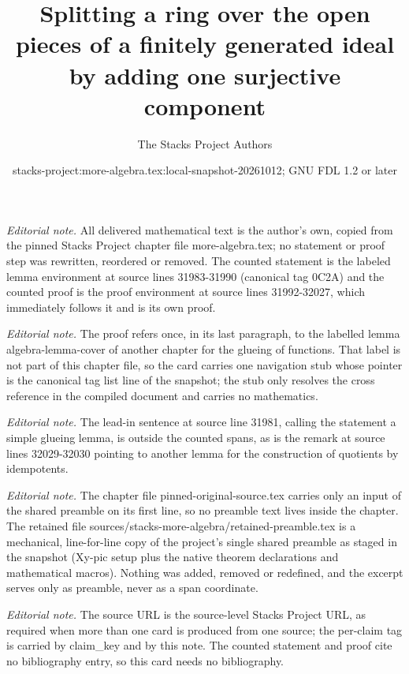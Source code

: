\documentclass[10pt,a4paper]{amsart}
\title{Splitting a ring over the open pieces of a finitely generated ideal by adding one surjective component}
\author{The Stacks Project Authors}
\date{stacks-project:more-algebra.tex:local-snapshot-20261012; GNU FDL 1.2 or later}
\theoremstyle{plain}
\theoremstyle{definition}
\theoremstyle{remark}
\numberwithin{equation}{subsection}
\begin{document}
\maketitle
\setcounter{subsection}{1}
\noindent\textit{Editorial note.} All delivered mathematical text is the author's own, copied from the pinned Stacks Project chapter file more-algebra.tex; no statement or proof step was rewritten, reordered or removed. The counted statement is the labeled lemma environment at source lines 31983-31990 (canonical tag 0C2A) and the counted proof is the proof environment at source lines 31992-32027, which immediately follows it and is its own proof.\par\medskip
\noindent\textit{Editorial note.} The proof refers once, in its last paragraph, to the labelled lemma algebra-lemma-cover of another chapter for the glueing of functions. That label is not part of this chapter file, so the card carries one navigation stub whose pointer is the canonical tag list line of the snapshot; the stub only resolves the cross reference in the compiled document and carries no mathematics.\par\medskip
\noindent\textit{Editorial note.} The lead-in sentence at source line 31981, calling the statement a simple glueing lemma, is outside the counted spans, as is the remark at source lines 32029-32030 pointing to another lemma for the construction of quotients by idempotents.\par\medskip
\noindent\textit{Editorial note.} The chapter file pinned-original-source.tex carries only an input of the shared preamble on its first line, so no preamble text lives inside the chapter. The retained file sources/stacks-more-algebra/retained-preamble.tex is a mechanical, line-for-line copy of the project's single shared preamble as staged in the snapshot (Xy-pic setup plus the native theorem declarations and mathematical macros). Nothing was added, removed or redefined, and the excerpt serves only as preamble, never as a span coordinate.\par\medskip
\noindent\textit{Editorial note.} The source URL is the source-level Stacks Project URL, as required when more than one card is produced from one source; the per-claim tag is carried by claim\_key and by this note. The counted statement and proof cite no bibliography entry, so this card needs no bibliography.\par\medskip
\end{document}
